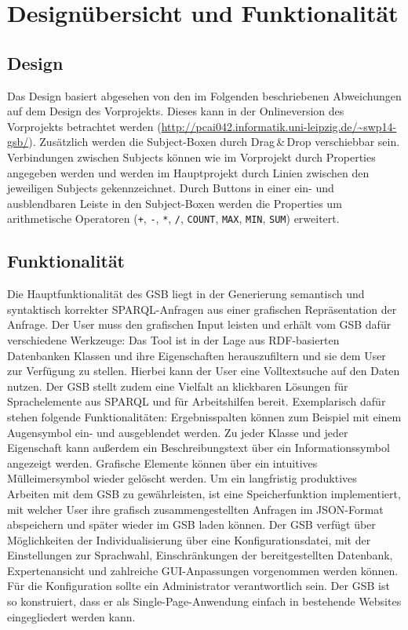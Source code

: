 \section{Designübersicht und Funktionalität}

\subsection*{Design}

Das Design basiert abgesehen von den im Folgenden beschriebenen
Abweichungen auf dem Design des Vorprojekts. Dieses kann in der
Onlineversion des Vorprojekts betrachtet werden (\url{http://pcai042.informatik.uni-leipzig.de/~swp14-gsb/}).
Zusätzlich werden die Subject-Boxen durch Drag\,\&\,Drop verschiebbar sein. Verbindungen zwischen Subjects können wie im Vorprojekt durch Properties angegeben werden und werden im Hauptprojekt durch Linien zwischen den jeweiligen Subjects gekennzeichnet.
Durch Buttons in einer ein- und ausblendbaren Leiste in den
Subject-Boxen werden die Properties um arithmetische Operatoren
(\verb-+-, \verb+-+, \verb+*+, \verb+/+, \verb+COUNT+, \verb+MAX+, \verb+MIN+, \verb+SUM+)
erweitert.

\subsection*{Funktionalität}
Die Hauptfunktionalität des GSB liegt in der Generierung semantisch und syntaktisch korrekter SPARQL-Anfragen aus einer grafischen Repräsentation der Anfrage. Der User muss den grafischen Input leisten und erhält vom GSB dafür verschiedene Werkzeuge:
Das Tool ist in der Lage aus RDF-basierten Datenbanken Klassen und ihre Eigenschaften herauszufiltern und sie dem User zur Verfügung zu stellen. Hierbei kann der User eine Volltextsuche auf den Daten nutzen. Der GSB stellt zudem eine Vielfalt an klickbaren Lösungen für Sprachelemente aus SPARQL und für Arbeitshilfen bereit. Exemplarisch dafür stehen folgende Funktionalitäten: Ergebnisspalten können zum Beispiel mit einem Augensymbol ein- und ausgeblendet werden. Zu jeder Klasse und jeder Eigenschaft kann außerdem ein Beschreibungstext über ein Informationssymbol angezeigt werden. Grafische Elemente können über ein intuitives Mülleimersymbol wieder gelöscht werden.
Um ein langfristig produktives Arbeiten mit dem GSB zu gewährleisten, ist eine Speicherfunktion implementiert, mit welcher User ihre grafisch zusammengestellten Anfragen im JSON-Format abspeichern und später wieder im GSB laden können. 
Der GSB verfügt über Möglichkeiten der Individualisierung über eine Konfigurationsdatei, mit der Einstellungen zur Sprachwahl, Einschränkungen der bereitgestellten Datenbank, Expertenansicht und zahlreiche GUI-Anpassungen vorgenommen werden können. Für die Konfiguration sollte ein Administrator verantwortlich sein.
Der GSB ist so konstruiert, dass er als Single-Page-Anwendung einfach
in bestehende Websites eingegliedert werden kann.


